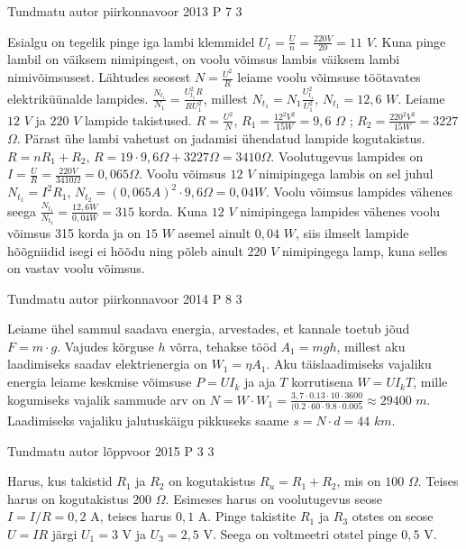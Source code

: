 \documentclass[11pt]{article}
\begin{document}
{%
{Tundmatu autor} %
{piirkonnavoor} %
{2013} %
{P 7} %
{3} %
{

\ifSolution
Esialgu on tegelik pinge iga lambi klemmidel $U_t = \frac{U}{n} = \frac{220V}{20} = 11$ $V$.
Kuna pinge lambil on väiksem nimipingest, on voolu võimsus lambis väiksem lambi nimivõimsusest. Lähtudes seosest $N = \frac{U^2}{R}$ leiame voolu võimsuse töötavates elektriküünalde lampides. $\frac{N_{t_1}}{N_1} = \frac{U^2 _{t_1} R}{RU^2 _1}$,  millest $N_{t_1} = N_1 \frac{U^2 _{t_1}}{U^2_1}$, $N_{t_1} = 12,6$ $W$. 
Leiame $12$ $V$ ja $220$ $V$ lampide takistused.
$R = \frac{U^2}{N}$, $R_1 = \frac{12^2 V^2}{15 W} = 9,6$ $\Omega$ ; $R_2 = \frac{220^2 V^2}{15 W} = 3227$ $\Omega$.
Pärast ühe lambi vahetust on jadamisi ühendatud lampide kogutakistus.
$R = n R_1 + R_2$, $R = 19 \cdot 9,6 \Omega + 3227 \Omega = 3410 \Omega$.
Voolutugevus lampides on $I = \frac{U}{R} = \frac{220 V}{3410 \Omega} = 0,065 \Omega$.
Voolu võimsus $12$ $V$ nimipingega lambis on sel juhul $N_{t_1} = I^2 R_1$, $N_{t_2} = (0,065A)^2 \cdot 9,6 \Omega = 0,04W$.
Voolu võimsus lampides vähenes seega $\frac{N_{t_1}}{N_{t_2}} = \frac{12,6 W}{0,04W} = 315 $ korda.
Kuna $12$ $V$ nimipingega lampides vähenes voolu võimsus 315 korda ja on $15$ $W$ asemel ainult $0,04$ $W$, siis ilmselt lampide hõõgniidid isegi ei hõõdu ning põleb ainult $220$ $V$ nimipingega lamp, kuna selles on vastav voolu võimsus.
\fi
}

{Tundmatu autor} %
{piirkonnavoor} %
{2014} %
{P 8} %
{3} %
{

\ifSolution
Leiame ühel sammul saadava energia, arvestades, et kannale toetub jõud $F = m \cdot g$. Vajudes kõrguse $h$ võrra, tehakse tööd $A_1 = mgh$, millest aku laadimiseks saadav elektrienergia on $W_1 = \eta A_1$. Aku täislaadimiseks vajaliku energia leiame keskmise võimsuse $P = UI_k$ ja aja $T$ korrutisena $W = UI_kT$, mille kogumiseks vajalik sammude arv on $N = W\cdot W_1 = \frac{3,7 \cdot 0.13 \cdot 10 \cdot 3600}{(0.2 \cdot 60 \cdot 9.8 \cdot 0.005} \approx 29400$ $m$. Laadimiseks vajaliku jalutuskäigu pikkuseks saame $s = N \cdot d = 44$ $km$.
\fi
}

{Tundmatu autor} %
{lõppvoor} %
{2015} %
{P 3} %
{3} %
{

\ifSolution
Harus, kus takistid $R_1$ ja $R_2$ on kogutakistus $R_u = R_1 + R_2$, mis on $100$ $\Omega$. Teises harus on kogutakistus $200$ $\Omega$. Esimeses harus on voolutugevus seose $I = I/R = 0,2$ A, teises harus $0,1$ A.
Pinge takistite $R_1$ ja $R_3$ otstes on seose $U = I R$ järgi $U_1 = 3$ V ja $U_3 = 2,5$ V. Seega on voltmeetri otstel pinge $0,5$ V.
\fi
}

}
\end{document}
